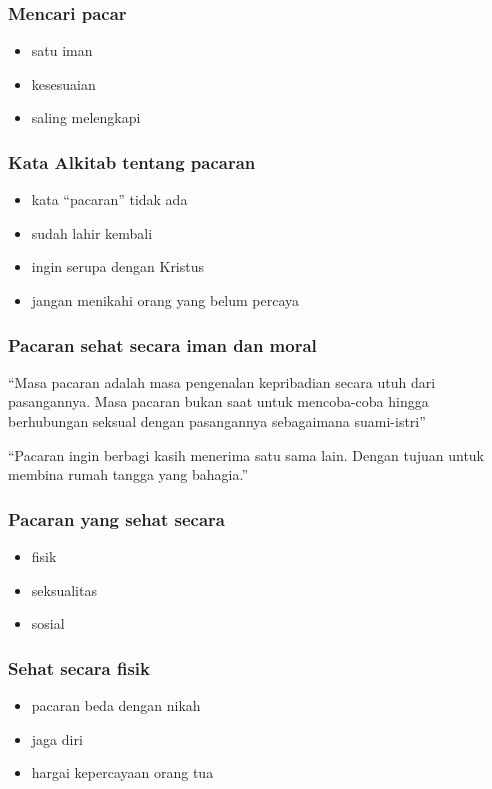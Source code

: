 \documentclass[12pt,a4paper]{beamer}
\begin{document}
\begin{frame}
\frametitle{Mencari pacar}
\begin{itemize}[<+->]
\item satu iman
\item kesesuaian
\item saling melengkapi
\end{itemize}
\end{frame}

\begin{frame}
\frametitle{Kata Alkitab tentang pacaran}
\begin{itemize}[<+->]
\item kata ``pacaran'' tidak ada
\item sudah lahir kembali
\item ingin serupa dengan Kristus
\item jangan menikahi orang yang belum percaya
\end{itemize}
\end{frame}

\begin{frame}
\frametitle{Pacaran sehat secara iman dan moral}
``Masa pacaran adalah masa pengenalan kepribadian secara utuh dari pasangannya. Masa pacaran bukan saat untuk mencoba-coba hingga berhubungan seksual dengan pasangannya sebagaimana suami-istri''

``Pacaran ingin berbagi kasih menerima satu sama lain. Dengan tujuan untuk membina rumah tangga yang bahagia.''

\end{frame}

\begin{frame}
\frametitle{Pacaran yang sehat secara}
\begin{itemize}[<+->]
\item fisik
\item seksualitas
\item sosial
\end{itemize}
\end{frame}

\begin{frame}
\frametitle{Sehat secara fisik}
\begin{itemize}[<+->]
\item pacaran beda dengan nikah
\item jaga diri
\item hargai kepercayaan orang tua
\end{itemize}
\end{frame}
\end{document}
